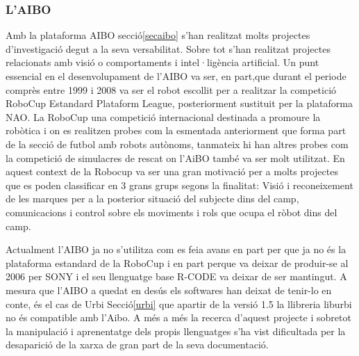 \documentclass[12pt,a4paper,final,twoside]{article}
\begin{document}
\subsubsection{L'AIBO}

Amb la plataforma AIBO secció\ref{secaibo} s'han realitzat molts projectes d'investigació degut a la seva versabilitat. Sobre tot s'han realitzat projectes relacionats amb visió\cite{xavi} o comportaments i intel·ligència artificial\cite{riki}.
Un punt essencial en el desenvolupament de l'AIBO va ser, en part,que durant el periode comprès entre 1999 i 2008 va ser el robot escollit per a realitzar la competició RoboCup Estandard Plataform League, posteriorment sustituit per la plataforma NAO. La RoboCup una competició internacional destinada a promoure la robòtica i on es realitzen probes com la esmentada anteriorment que forma part de la secció de futbol amb robots autònoms, tanmateix hi han altres probes com la competició de simulacres de rescat on l'AiBO també va ser molt utilitzat\cite{robocup}.
En aquest context de la Robocup va ser una gran motivació per a molts projectes que es poden classificar en 3 grans grups segons la finalitat: Visió i reconeixement de les marques per a la posterior situació del subjecte dins del camp\cite{morales}, comunicacions i control sobre els moviments\cite{jesus} i rols que ocupa el ròbot dins del camp\cite{metod}.

Actualment l'AIBO ja no s'utilitza com es feia avans en part per que ja no és la plataforma estandard de la RoboCup i en part perque va deixar de produir-se al 2006 per SONY i el seu llenguatge base R-CODE va deixar de ser mantingut.
A mesura que l'AIBO a quedat en desús els softwares han deixat de tenir-lo en conte, és el cas de Urbi Secció\ref{urbi} que apartir de la versió 1.5 la llibreria liburbi no és compatible amb l'Aibo. 
A més a més la recerca d'aquest projecte i sobretot la manipulació i aprenentatge dels propis llenguatges s'ha vist dificultada per la desaparició de la xarxa de gran part de la seva documentació.
\end{document}
